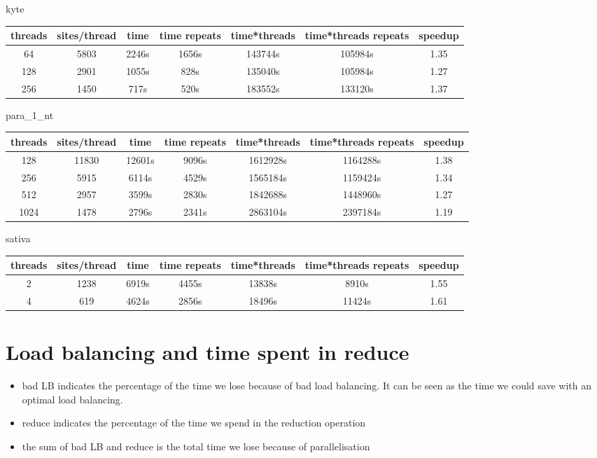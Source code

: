 \documentclass[a4paper]{article}
\begin{document}
kyte

\begin{tabular}{|c|c|c|c|c|c|c|}
\hline threads & sites/thread & time & time repeats & time*threads & time*threads repeats & speedup \\
\hline 64 & 5803 & 2246s & 1656s & 143744s & 105984s & 1.35 \\
\hline 128 & 2901 & 1055s & 828s & 135040s & 105984s & 1.27 \\
\hline 256 & 1450 & 717s & 520s & 183552s & 133120s & 1.37 \\
\hline
\end{tabular}
\newline

para\_1\_nt

\begin{tabular}{|c|c|c|c|c|c|c|}
\hline threads & sites/thread & time & time repeats & time*threads & time*threads repeats & speedup \\
\hline 128 & 11830 & 12601s & 9096s & 1612928s & 1164288s & 1.38 \\
\hline 256 & 5915 & 6114s & 4529s & 1565184s & 1159424s & 1.34 \\
\hline 512 & 2957 & 3599s & 2830s & 1842688s & 1448960s & 1.27 \\
\hline 1024 & 1478 & 2796s & 2341s & 2863104s & 2397184s & 1.19 \\
\hline
\end{tabular}
\newline

sativa

\begin{tabular}{|c|c|c|c|c|c|c|}
\hline threads & sites/thread & time & time repeats & time*threads & time*threads repeats & speedup \\
\hline 2 & 1238 & 6919s & 4455s & 13838s & 8910s & 1.55 \\
\hline 4 & 619 & 4624s & 2856s & 18496s & 11424s & 1.61 \\
\hline
\end{tabular}
\newline



\section{Load balancing and time spent in reduce}

\begin{itemize}
\item bad LB indicates the percentage of the time we lose because of bad load balancing. It can be seen as the time we could save with an optimal load balancing.
\item reduce indicates the percentage of the time we spend in the reduction operation 
\item the sum of bad LB and reduce is the total time we lose because of parallelisation
\end{itemize}
\end{document}
